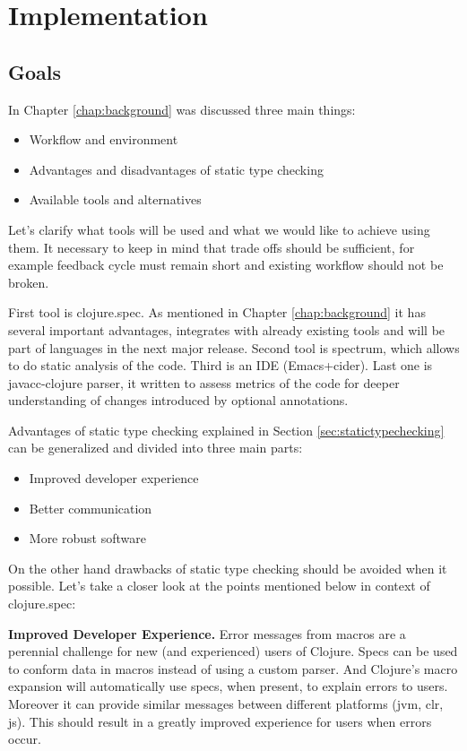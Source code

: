 \chapter{Implementation}
\label{chap:implementation}

\section{Goals}

In Chapter \ref{chap:background} was discussed three main things:
\begin{itemize}
\item Workflow and environment
\item Advantages and disadvantages of static type checking
\item Available tools and alternatives
\end{itemize}

Let's clarify what tools will be used and what we would like to achieve using
them. It necessary to keep in mind that trade offs should be sufficient, for
example feedback cycle must remain short and existing workflow should not be
broken.

First tool is clojure.spec. As mentioned in Chapter \ref{chap:background} it has
several important advantages, integrates with already existing tools and will be
part of languages in the next major release. Second tool is spectrum, which
allows to do static analysis of the code. Third is an IDE (Emacs+cider). Last
one is javacc-clojure parser, it written to assess metrics of the code for
deeper understanding of changes introduced by optional annotations.

Advantages of static type checking explained in Section
\ref{sec:statictypechecking} can be generalized and divided into three main
parts:

\begin{itemize}
\item Improved developer experience
\item Better communication
\item More robust software
\end{itemize}

On the other hand drawbacks of static type checking should be avoided when it
possible. Let's take a closer look at the points mentioned below in context of clojure.spec:

\textbf{Improved Developer Experience.} Error messages from macros are a
perennial challenge for new (and experienced) users of Clojure. Specs can be
used to conform data in macros instead of using a custom parser. And Clojure’s
macro expansion will automatically use specs, when present, to explain errors to
users. Moreover it can provide similar messages between different platforms
(jvm, clr, js). This should result in a greatly improved experience for users
when errors occur.

